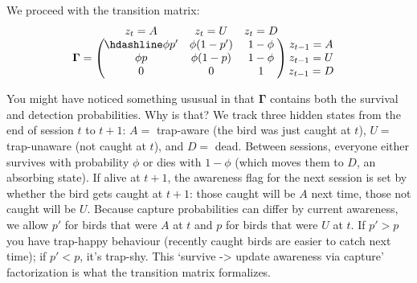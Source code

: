 \documentclass[
  12pt,
]{krantz}
\begin{document}
We proceed with the transition matrix:
\[\begin{matrix}
& \\
\mathbf{\Gamma} =
\left ( \vphantom{ \begin{matrix} 12 \\ 12 \\ 12 \end{matrix} } \right .
\end{matrix}
\hspace{-1.2em}
\begin{matrix}
z_t=A & z_t=U & z_t=D \\ \hdashline
\phi p' & \phi (1-p') & 1 - \phi\\
\phi p & \phi (1-p) & 1 - \phi\\
0 & 0 & 1
\end{matrix}
\hspace{-0.2em}
\begin{matrix}
& \\
\left . \vphantom{ \begin{matrix} 12 \\ 12 \\ 12 \end{matrix} } \right )
\begin{matrix}
z_{t-1}=A \\ z_{t-1}=U \\ z_{t-1}=D
\end{matrix}
\end{matrix}\]

You might have noticed something ususual in that \(\mathbf{\Gamma}\) contains both the survival and detection probabilities. Why is that? We track three hidden states from the end of session \(t\) to \(t+1\): \(A =\) trap-aware (the bird was just caught at \(t\)), \(U =\) trap-unaware (not caught at \(t\)), and \(D =\) dead. Between sessions, everyone either survives with probability \(\phi\) or dies with \(1 - \phi\) (which moves them to \(D\), an absorbing state). If alive at \(t+1\), the awareness flag for the next session is set by whether the bird gets caught at \(t+1\): those caught will be \(A\) next time, those not caught will be \(U\). Because capture probabilities can differ by current awareness, we allow \(p'\) for birds that were \(A\) at \(t\) and \(p\) for birds that were \(U\) at \(t\). If \(p'>p\) you have trap-happy behaviour (recently caught birds are easier to catch next time); if \(p'<p\), it's trap-shy. This `survive -\textgreater{} update awareness via capture' factorization is what the transition matrix formalizes.
\end{document}
